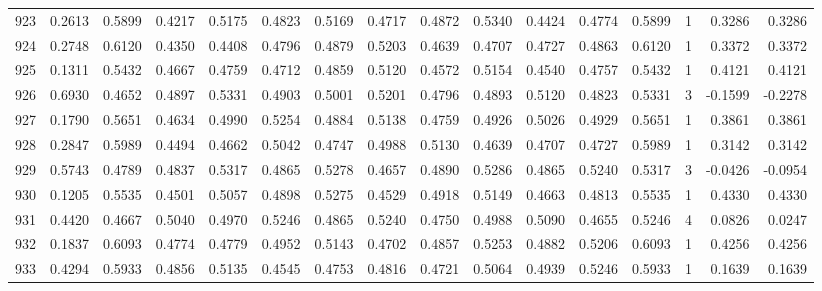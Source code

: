 \begin{tabular}{lrrrrrrrrrrrrrrr}
923 &      0.2613 &  0.5899 &  0.4217 &  0.5175 &  0.4823 &  0.5169 &  0.4717 &  0.4872 &  0.5340 &  0.4424 &   0.4774 &     0.5899 &      1 &                    0.3286 &                     0.3286 \\
924 &      0.2748 &  0.6120 &  0.4350 &  0.4408 &  0.4796 &  0.4879 &  0.5203 &  0.4639 &  0.4707 &  0.4727 &   0.4863 &     0.6120 &      1 &                    0.3372 &                     0.3372 \\
925 &      0.1311 &  0.5432 &  0.4667 &  0.4759 &  0.4712 &  0.4859 &  0.5120 &  0.4572 &  0.5154 &  0.4540 &   0.4757 &     0.5432 &      1 &                    0.4121 &                     0.4121 \\
926 &      0.6930 &  0.4652 &  0.4897 &  0.5331 &  0.4903 &  0.5001 &  0.5201 &  0.4796 &  0.4893 &  0.5120 &   0.4823 &     0.5331 &      3 &                   -0.1599 &                    -0.2278 \\
927 &      0.1790 &  0.5651 &  0.4634 &  0.4990 &  0.5254 &  0.4884 &  0.5138 &  0.4759 &  0.4926 &  0.5026 &   0.4929 &     0.5651 &      1 &                    0.3861 &                     0.3861 \\
928 &      0.2847 &  0.5989 &  0.4494 &  0.4662 &  0.5042 &  0.4747 &  0.4988 &  0.5130 &  0.4639 &  0.4707 &   0.4727 &     0.5989 &      1 &                    0.3142 &                     0.3142 \\
929 &      0.5743 &  0.4789 &  0.4837 &  0.5317 &  0.4865 &  0.5278 &  0.4657 &  0.4890 &  0.5286 &  0.4865 &   0.5240 &     0.5317 &      3 &                   -0.0426 &                    -0.0954 \\
930 &      0.1205 &  0.5535 &  0.4501 &  0.5057 &  0.4898 &  0.5275 &  0.4529 &  0.4918 &  0.5149 &  0.4663 &   0.4813 &     0.5535 &      1 &                    0.4330 &                     0.4330 \\
931 &      0.4420 &  0.4667 &  0.5040 &  0.4970 &  0.5246 &  0.4865 &  0.5240 &  0.4750 &  0.4988 &  0.5090 &   0.4655 &     0.5246 &      4 &                    0.0826 &                     0.0247 \\
932 &      0.1837 &  0.6093 &  0.4774 &  0.4779 &  0.4952 &  0.5143 &  0.4702 &  0.4857 &  0.5253 &  0.4882 &   0.5206 &     0.6093 &      1 &                    0.4256 &                     0.4256 \\
933 &      0.4294 &  0.5933 &  0.4856 &  0.5135 &  0.4545 &  0.4753 &  0.4816 &  0.4721 &  0.5064 &  0.4939 &   0.5246 &     0.5933 &      1 &                    0.1639 &                     0.1639 \\

\end{tabular}
